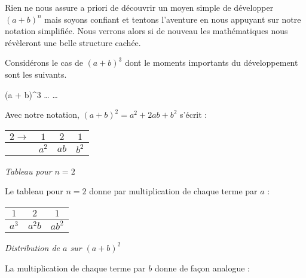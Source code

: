 Rien ne nous assure a priori de découvrir un moyen simple de développer $(a + b)^n$ mais soyons confiant et tentons l'aventure en nous appuyant sur notre notation simplifiée. Nous verrons alors si de nouveau les mathématiques nous révèleront une belle structure cachée.


\medskip

Considérons le cas de $(a + b)^3$ dont le moments importants du développement sont les suivants.


\medskip

\begin{stepcalc}[style = sar]
	(a + b)^3
		\explnext{}
	\dots
		\explnext{}
		\explnext[\hideit+]{}
	\phantom{x}\kern4pt%
		\explnext{}
		\explnext[\hideit+]{}
	\phantom{x}\kern4pt%
		\explnext{}
	\dots\end{stepcalc}


\medskip

Avec notre notation, $(a + b)^2 = a^2 + 2 a b + b^2$ s'écrit :


\medskip
\begin{center}
\begin{tabular}{|l*{3}{|c}|}
	\hline
	$2 \rightarrow$
		& $1$    &  $2$    &  $1$
	\\ \hline
		& $a^2$  &  $a b$  &  $b^2$
	\\ \hline
\end{tabular}

\smallskip
\itshape\small
Tableau pour $n = 2$
\end{center}


\medskip

Le tableau pour $n = 2$ donne par multiplication de chaque terme par $a$ :


\medskip
\begin{center}
\begin{tabular}{*{3}{|c}|}
	\hline
		$1$    &  $2$      &  $1$
	\\ \hline
		$a^3$  &  $a^2 b$  &  $a b^2$
	\\ \hline
\end{tabular}

\smallskip
\itshape\small
Distribution de $a$ sur $(a + b)^2$
\end{center}


\medskip

La multiplication de chaque terme par $b$ donne de façon analogue :

